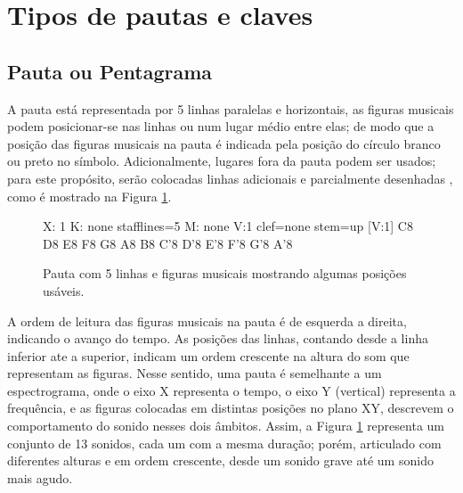 \section{Tipos de pautas e claves}
\label{sec:tipospauta}

\subsection{Pauta ou Pentagrama}
\label{sec:pauta}
A pauta está representada por 5 linhas paralelas e horizontais, 
as figuras musicais podem posicionar-se nas linhas ou num lugar médio entre elas;
de modo que a posição das figuras musicais na pauta é indicada 
pela posição do círculo branco ou preto no símbolo.
Adicionalmente, lugares fora da pauta podem ser usados; 
para este propósito, serão colocadas linhas adicionais e parcialmente desenhadas \cite[pp. 10]{cardoso1973curso},
como é mostrado na Figura \ref{fig:abc-pauta5}.
\begin{figure}[H]
\centering
\begin{abc}[name=abc-pauta5]
%
X: 1 %
K: none stafflines=5 %
M: none %
V:1 clef=none stem=up %
%
[V:1] C8 D8 E8 F8 G8 A8 B8 C'8 D'8 E'8 F'8 G'8 A'8
\end{abc}
\caption{Pauta com 5 linhas e figuras musicais mostrando algumas posições usáveis.}
\label{fig:abc-pauta5}
\end{figure}
A ordem de leitura das figuras musicais na pauta é de esquerda a direita, 
indicando o avanço  do tempo.
As posições das linhas, contando desde a linha inferior ate a superior, 
indicam um ordem crescente na altura do som que representam as figuras.
Nesse sentido, 
uma pauta é semelhante a um espectrograma, onde o eixo X representa o tempo,
o eixo Y (vertical) representa a frequência, e as figuras colocadas em distintas posições no plano XY, descrevem
o comportamento do sonido nesses dois âmbitos. Assim, a Figura \ref{fig:abc-pauta5}
representa um conjunto de 13 sonidos, cada um com a mesma duração; 
porém, articulado com diferentes alturas e em ordem crescente, 
desde um sonido grave até um sonido mais agudo.


